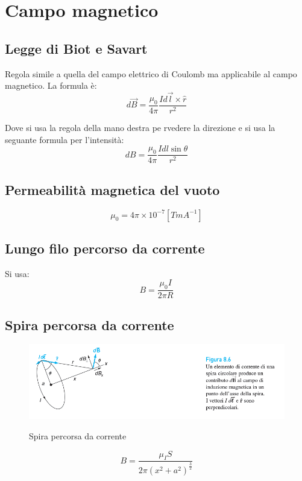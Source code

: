 \section{Campo magnetico}
\subsection{Legge di Biot e Savart}
Regola simile a quella del campo elettrico di Coulomb ma applicabile
al campo magnetico.
La formula è:
\begin{equation}
    d\vec{B} = \frac{\mu_0}{4\pi}\frac{Id\vec{l}\times\hat{r}}{r^2}
\end{equation}

Dove si usa la regola della mano destra pe rvedere la direzione 
e si usa la seguante formula per l'intensità:
\begin{equation}
    dB = \frac{\mu_0}{4\pi}\frac{Idl\sin\theta}{r^2}
\end{equation}

\subsection{Permeabilità magnetica del vuoto}
\begin{equation}
    \mu_0 = 4\pi \times 10^{-7} [TmA^{-1}]
\end{equation}

\subsection{Lungo filo percorso da corrente}
Si usa:
\begin{equation}
    B = \frac{\mu_0 I}{2\pi R}
\end{equation}

\subsection{Spira percorsa da corrente}
\begin{figure}[H]
    \centering
    \includegraphics[width=0.5\linewidth]{imgs/13 - spira.png}
    \label{fig:spira_corrente}
    \caption{Spira percorsa da corrente}
\end{figure}
\begin{equation}
    B = \frac{\mu_IS}{2\pi(x^2+a^2)^{\frac{3}{2}}}
\end{equation}

